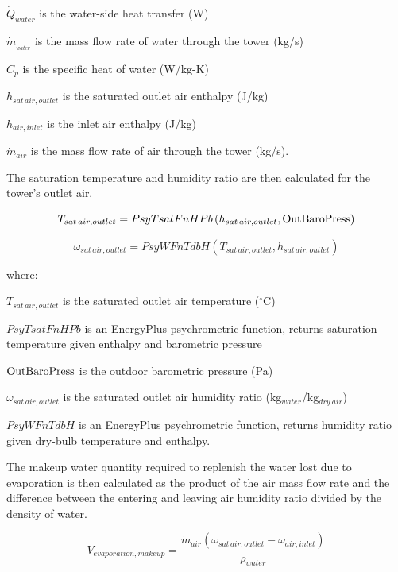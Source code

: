 \({\dot Q_{water}}\) is the water-side heat transfer (W)

\({\dot m_{_{water}}}\) is the mass flow rate of water through the tower (kg/s)

\({C_p}\) is the specific heat of water (W/kg-K)

\({h_{sat\,air,outlet}}\) is the saturated outlet air enthalpy (J/kg)

\({h_{air,inlet}}\) is the inlet air enthalpy (J/kg)

\({\dot m_{air}}\) is the mass flow rate of air through the tower (kg/s).

The saturation temperature and humidity ratio are then calculated for the tower's outlet air.

\begin{equation}
{T_{sat\,air,outlet}} = PsyTsatFnHPb\left( {{h_{sat\,air,outlet}},{\rm{OutBaroPress}}} \right)
\end{equation}

\begin{equation}
{\omega_{sat\,air,outlet}} = PsyWFnTdbH\left( {{T_{sat\,air,outlet}},{h_{sat\,air,outlet}}} \right)
\end{equation}

where:

\({T_{sat\,air,outlet}}\) is the saturated outlet air temperature (\(^{\circ}\)C)

\(PsyTsatFnHPb\) is an EnergyPlus psychrometric function, returns saturation temperature given enthalpy and barometric pressure

\({\rm{OutBaroPress}}\) is the outdoor barometric pressure (Pa)

\({\omega_{sat\,air,outlet}}\) is the saturated outlet air humidity ratio (kg\(_{water}\)/kg\(_{dry~air}\))

\(PsyWFnTdbH\) is an EnergyPlus psychrometric function, returns humidity ratio given dry-bulb temperature and enthalpy.

The makeup water quantity required to replenish the water lost due to evaporation is then calculated as the product of the air mass flow rate and the difference between the entering and leaving air humidity ratio divided by the density of water.

\begin{equation}
{\dot V_{evaporation,makeup}} = \frac{{{{\dot m}_{air}}\left( {{\omega_{sat\,air,outlet}} - {\omega_{air,inlet}}} \right)}}{{{\rho_{water}}}}
\end{equation}

